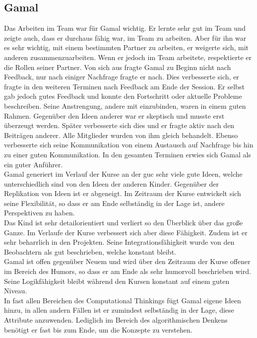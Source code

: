 \subsection*{Gamal}
Das Arbeiten im Team war für Gamal wichtig. Er lernte sehr gut im Team und zeigte auch, dass er durchaus fähig war, im Team zu arbeiten. Aber für ihn war es sehr wichtig, mit einem bestimmten Partner zu arbeiten, er weigerte sich, mit anderen zusammenzuarbeiten. Wenn er jedoch im Team arbeitete, respektierte er die Rollen seiner Partner. Von sich aus fragte Gamal zu Beginn nicht nach Feedback, nur nach einiger Nachfrage fragte er nach. Dies verbesserte sich, er fragte in den weiteren Terminen nach Feedback am Ende der Session. Er selbst gab jedoch gutes Feedback und konnte den Fortschritt oder aktuelle Probleme beschreiben. Seine Anstrengung, andere mit einzubinden, waren in einem guten Rahmen. Gegenüber den Ideen anderer war er skeptisch und musste erst überzeugt werden. Später verbesserte sich dies und er fragte aktiv nach den Beiträgen anderer. Alle Mitglieder wurden von ihm gleich behandelt. Ebenso verbesserte sich seine Kommunikation von einem Austausch auf Nachfrage bis hin zu einer guten Kommunikation. In den gesamten Terminen erwies sich Gamal als ein guter Anführer. \\
Gamal generiert im Verlauf der Kurse an der \acrshort{guc} sehr viele gute Ideen, welche unterschiedlich sind von den Ideen der anderen Kinder. Gegenüber der Replikation von Ideen ist er abgeneigt. Im Zeitraum der Kurse entwickelt sich seine Flexibilität, so dass er am Ende selbständig in der Lage ist, andere Perspektiven zu haben. \\
Das Kind ist sehr detailorientiert und verliert so den Überblick über das große Ganze. Im Verlaufe der Kurse verbessert sich aber diese Fähigkeit. Zudem ist er sehr beharrlich in den Projekten. Seine Integrationsfähigkeit wurde von den Beobachtern als gut beschrieben, welche konstant bleibt.\\
Gamal ist offen gegenüber Neuem und wird über den Zeitraum der Kurse offener im Bereich des Humors, so dass er am Ende als sehr humorvoll beschrieben wird.\\
Seine Logikfähigkeit bleibt während den Kursen konstant auf einem guten Niveau.\\
In fast allen Bereichen des Computational Thinkings fügt Gamal eigene Ideen hinzu, in allen andern Fällen ist er zumindest selbständig in der Lage, diese Attribute anzuwenden. Lediglich im Bereich des algorithmischen Denkens benötigt er fast bis zum Ende, um die Konzepte zu verstehen.

